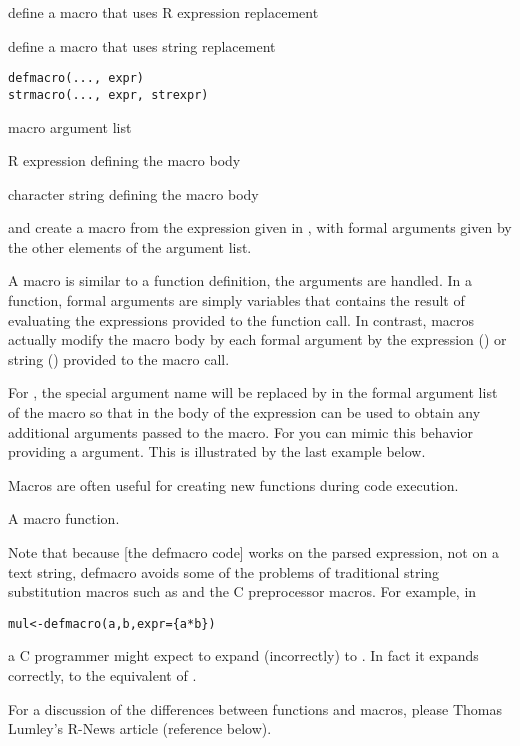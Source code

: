 \begin{Description}\relax
{} define a macro that uses R expression replacement

 define a macro that uses string replacement
\end{Description}
\begin{Usage}
\begin{verbatim}
defmacro(..., expr)
strmacro(..., expr, strexpr)
\end{verbatim}
\end{Usage}
\begin{Arguments}
\begin{ldescription}
\item[\code{...}] macro argument list 
\item[\code{expr}] R expression defining the macro body 
\item[\code{strexpr}] character string defining the macro body 
\end{ldescription}
\end{Arguments}
\begin{Details}\relax
{} and  create a macro from the expression
given in , with formal arguments given by the other
elements of the argument list.

A macro is similar to a function definition, the arguments are
handled.  In a function, formal arguments are simply variables that 
contains the result of evaluating the expressions provided to the
function call.  In contrast, macros actually modify the macro body by
 each formal argument by the expression
() or string () provided to the macro
call.

For , the special argument name  will be
replaced by  in the formal argument list of the macro so
that   in the body of the expression can be used to obtain
any additional arguments passed to the macro. For  you
can mimic this behavior providing a  argument.  This is
illustrated by the last example below.

Macros are often useful for creating new functions during code execution.
\end{Details}
\begin{Value}
A macro function.
\end{Value}
\begin{Note}\relax
Note that because [the defmacro code] works on the parsed expression,
not on a text string, defmacro avoids some of the problems of
traditional string substitution macros such as  and the C
preprocessor macros. For example, in
\begin{alltt}
  mul <- defmacro(a, b, expr=\{a*b\})
\end{alltt}
a C programmer might expect
 to expand (incorrectly) to . In fact it
expands correctly, to the equivalent of .

For a discussion of the differences between functions
and macros, please Thomas Lumley's R-News article (reference below).
\end{Note}
